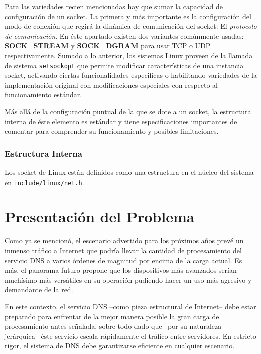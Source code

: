 Para las variedades recien mencionadas hay que sumar la capacidad de configuración de un socket. La primera y más importante es la configuración del modo de conexión que regirá la dinámica de comunicación del socket: El \emph{protocolo de comunicación}. En éste apartado existen dos variantes comúnmente usadas: \textbf{SOCK\_STREAM} y \textbf{SOCK\_DGRAM} para usar TCP o UDP respectivamente. Sumado a lo anterior, los sistemas Linux proveen de la llamada de sistema \verb=setsockopt= que permite modificar características de una instancia socket, activando ciertas funcionalidades especificas o habilitando variedades de la implementación original con modificaciones especiales con respecto al funcionamiento estándar.

Más allá de la configuración puntual de la que se dote a un socket, la estructura interna de éste elemento es estándar y tiene especificaciones importantes de comentar para comprender su funcionamiento y posibles limitaciones.

\subsubsection{Estructura Interna}
Los socket de Linux están definidos como una estructura en el núcleo del sistema en \verb=include/linux/net.h=.

\section{Presentación del Problema}
Como ya se mencionó, el escenario advertido para los próximos años prevé un inmenso tráfico a Internet que podría llevar la cantidad de procesamiento del servicio DNS a varios órdenes de magnitud por encima de la carga actual. Es más, el panorama futuro propone que los dispositivos más avanzados serían muchísimo más versátiles en su operación pudiendo hacer un uso más agresivo y demandante de la red. 

En este contexto, el servicio DNS --como pieza estructural de Internet-- debe estar preparado para enfrentar de la mejor manera posible la gran carga de procesamiento antes señalada, sobre todo dado que --por su naturaleza jerárquica-- éste servicio escala rápidamente el tráfico entre servidores. En estricto rigor, el sistema de DNS debe garantizarse eficiente en cualquier escenario.

